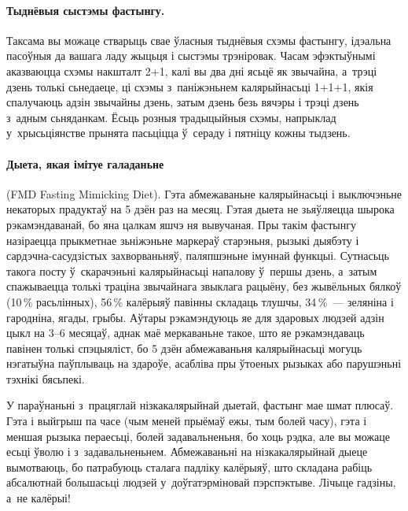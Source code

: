 \paragraph{Тыднёвыя сыстэмы фастынгу.}
Таксама вы можаце стварыць свае ўласныя тыднёвыя схэмы фастынгу, ідэальна пасоўныя да вашага ладу жыцьця і сыстэмы трэніровак. Часам эфэктыўнымі аказваюцца схэмы накшталт 2+1, калі вы два дні ясьцё як звычайна, а~трэці дзень толькі сьнедаеце, ці схэмы з~паніжэньнем калярыйнасьці 1+1+1, якія спалучаюць адзін звычайны дзень, затым дзень безь вячэры і трэці дзень з~адным сьняданкам. Ёсьць розныя традыцыйныя схэмы, напрыклад у~хрысьціянстве прынята пасьціцца ў~сераду і пятніцу кожны тыдзень.


\paragraph{Дыета, якая імітуе галаданьне} (FMD Fasting Mimicking Diet).
Гэта абмежаваньне калярыйнасьці і выключэньне некаторых прадуктаў на 5 дзён раз на месяц. Гэтая дыета не зьяўляецца шырока рэкамэндаванай, бо яна цалкам яшчэ ня вывучаная. Пры такім фастынгу назіраецца прыкметнае зьніжэньне маркераў старэньня, рызыкі дыябэту і сардэчна-сасудзістых захворваньняў, паляпшэньне імуннай функцыі. Сутнасьць такога посту ў~скарачэньні калярыйнасьці напалову ў~першы дзень, а~затым спажываецца толькі траціна звычайнага звыклага рацыёну, без жывёльных бялкоў (10\,\% расьлінных), 56\,\% калёрыяў павінны складаць тлушчы, 34\,\%~--- зеляніна і гародніна, ягады, грыбы. Аўтары рэкамэндуюць яе для здаровых людзей адзін цыкл на 3--6 месяцаў, аднак маё меркаваньне такое, што яе рэкамэндаваць павінен толькі спэцыяліст, бо 5 дзён абмежаваньня калярыйнасьці могуць нэгатыўна паўплываць на здароўе, асабліва пры ўтоеных рызыках або парушэньні тэхнікі бясьпекі.

У параўнаньні з~працяглай нізкакалярыйнай дыетай, фастынг мае шмат плюсаў. Гэта і выйгрыш па часе (чым меней прыёмаў ежы, тым болей часу), гэта і меншая рызыка пераесьці, болей задавальненьня, бо хоць рэдка, але вы можаце есьці ўволю і з~задавальненьнем. Абмежаваньні на нізкакалярыйнай дыеце вымотваюць, бо патрабуюць сталага падліку калёрыяў, што складана рабіць абсалютнай большасьці людзей у~доўгатэрміновай пэрспэктыве. Лічыце гадзіны, а~не калёрыі!

